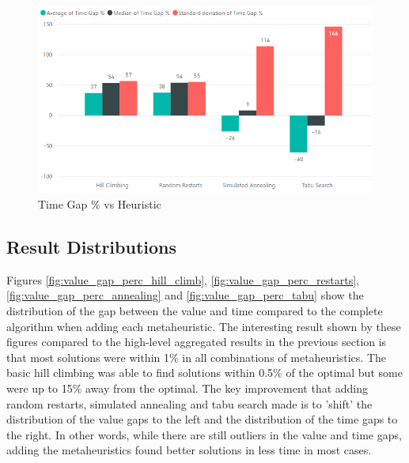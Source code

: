 \begin{figure}[h!]
    \centering
    \includegraphics[width=\textwidth]{Figures/Metaheuristics/time_gap_perc_vs_heuristic.png}
    \caption{Time Gap \% vs Heuristic}
    \label{fig:time_gap_perc_vs_heuristic}
\end{figure}


\subsection{Result Distributions}
\label{subsec:result_distributions}

Figures \ref{fig:value_gap_perc_hill_climb}, \ref{fig:value_gap_perc_restarts}, \ref{fig:value_gap_perc_annealing} and \ref{fig:value_gap_perc_tabu} show the distribution of the gap between the value and time compared to the complete algorithm when adding each metaheuristic. The interesting result shown by these figures compared to the high-level aggregated results in the previous section is that most solutions were within 1\% in all combinations of metaheuristics. The basic hill climbing was able to find solutions within 0.5\% of the optimal but some were up to 15\% away from the optimal. The key improvement that adding random restarts, simulated annealing and tabu search made is to 'shift' the distribution of the value gaps to the left and the distribution of the time gaps to the right. In other words, while there are still outliers in the value and time gaps, adding the metaheuristics found better solutions in less time in most cases.

